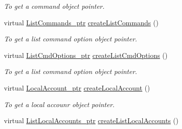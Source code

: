 \begin{DoxyCompactItemize}
\begin{DoxyCompactList}\small\item\em To get a command object pointer. \item\end{DoxyCompactList}\item 
\hypertarget{classUMS__Data_1_1UMS__DataFactory_acb42d481f1af37223d0be45afd65568d}{
virtual \hyperlink{classUMS__Data_1_1ListCommands}{ListCommands\_\-ptr} \hyperlink{classUMS__Data_1_1UMS__DataFactory_acb42d481f1af37223d0be45afd65568d}{createListCommands} ()}
\label{classUMS__Data_1_1UMS__DataFactory_acb42d481f1af37223d0be45afd65568d}

\begin{DoxyCompactList}\small\item\em To get a list command option object pointer. \item\end{DoxyCompactList}\item 
\hypertarget{classUMS__Data_1_1UMS__DataFactory_a973f45af9bc4e57bff477b1be1032dd2}{
virtual \hyperlink{classUMS__Data_1_1ListCmdOptions}{ListCmdOptions\_\-ptr} \hyperlink{classUMS__Data_1_1UMS__DataFactory_a973f45af9bc4e57bff477b1be1032dd2}{createListCmdOptions} ()}
\label{classUMS__Data_1_1UMS__DataFactory_a973f45af9bc4e57bff477b1be1032dd2}

\begin{DoxyCompactList}\small\item\em To get a list command option object pointer. \item\end{DoxyCompactList}\item 
\hypertarget{classUMS__Data_1_1UMS__DataFactory_a618fa8d5c9da30e885f900f9f7369e8d}{
virtual \hyperlink{classUMS__Data_1_1LocalAccount}{LocalAccount\_\-ptr} \hyperlink{classUMS__Data_1_1UMS__DataFactory_a618fa8d5c9da30e885f900f9f7369e8d}{createLocalAccount} ()}
\label{classUMS__Data_1_1UMS__DataFactory_a618fa8d5c9da30e885f900f9f7369e8d}

\begin{DoxyCompactList}\small\item\em To get a local accounr object pointer. \item\end{DoxyCompactList}\item 
\hypertarget{classUMS__Data_1_1UMS__DataFactory_a4262f6429d643ad6b5423787fcc61f75}{
virtual \hyperlink{classUMS__Data_1_1ListLocalAccounts}{ListLocalAccounts\_\-ptr} \hyperlink{classUMS__Data_1_1UMS__DataFactory_a4262f6429d643ad6b5423787fcc61f75}{createListLocalAccounts} ()}
\label{classUMS__Data_1_1UMS__DataFactory_a4262f6429d643ad6b5423787fcc61f75}


\end{DoxyCompactItemize}
